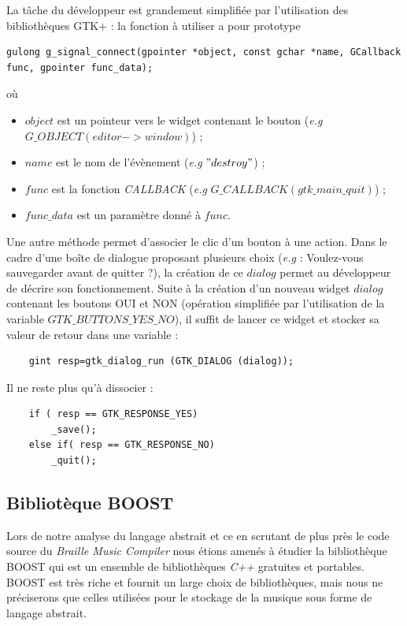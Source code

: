 La tâche du développeur est grandement simplifiée par l'utilisation des 
bibliothèques GTK+ : la fonction à utiliser a pour prototype
\begin{verbatim}
gulong g_signal_connect(gpointer *object, const gchar *name, GCallback func, gpointer func_data);
\end{verbatim}
où 
\begin{itemize}
\item $object$ est un pointeur vers le widget contenant le bouton (\textit{e.g} $G\_OBJECT(editor->window)$) ;
\item $name$ est le nom de l'évènement (\textit{e.g} $"destroy"$) ;
\item $func$ est la fonction \textit{CALLBACK} (\textit{e.g} $G\_CALLBACK(gtk\_main\_quit)$) ;
\item $func\_data$ est un paramètre donné à $func$.
\end{itemize}
Une autre méthode permet d'associer le clic d'un bouton à une action.
Dans le cadre d'une boîte de dialogue proposant plusieurs choix (\textit{e.g} : Voulez-vous 
sauvegarder avant de quitter ?), la création de ce $dialog$ permet au développeur de décrire son 
fonctionnement. Suite à la création d'un nouveau widget $dialog$ contenant les boutons OUI et NON (opération simplifiée 
par l'utilisation de la variable $GTK\_BUTTONS\_YES\_NO$), il suffit de lancer ce widget et stocker sa valeur de retour dans une variable :
\begin{verbatim}
	gint resp=gtk_dialog_run (GTK_DIALOG (dialog));
\end{verbatim}
Il ne reste plus qu'à dissocier :
\begin{verbatim}
	if ( resp == GTK_RESPONSE_YES)
		_save();
	else if( resp == GTK_RESPONSE_NO)
		_quit();
\end{verbatim}




\subsection{Bibliotèque BOOST}

Lors de notre analyse du langage abstrait et ce en scrutant de plus près le code source du \textit{Braille Music Compiler} nous étions amenés à étudier la bibliothèque BOOST  qui est un ensemble de bibliothèques \textit{C++} gratuites et portables. BOOST est très riche et fournit un large choix de bibliothèques, mais nous ne préciserons que celles utilisées pour le stockage de la musique sous forme de langage abstrait.


